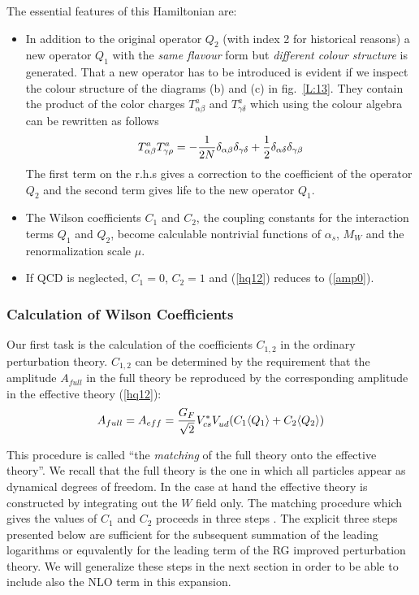 \documentclass[12pt]{article}
\def\as{\alpha_s}
\newcommand{\eqn}{\ref}
\begin{document}
\begin{itemize}
\begin{itemize}
\begin{itemize}
The essential features of this Hamiltonian are:
\begin{itemize}
\item In addition to the original operator $Q_2$ (with index 2 for 
historical reasons) 
 a new operator $Q_1$ with the {\it same flavour} form
but {\it different colour structure} is generated. 
That a new operator has to be introduced is evident if we
inspect the colour structure of the diagrams (b) and (c) in 
fig.~\ref{L:13}. They contain the
product of the color charges $T^a_{\alpha\beta}$ and 
$T^a_{\gamma\delta}$ which
using the colour algebra can be rewritten as follows
\begin{equation}\label{tata}
T^a_{\alpha\beta}T^a_{\gamma\rho}
=-{1\over 2N}\delta_{\alpha\beta}\delta_{\gamma\delta}+{1\over 2}
\delta_{\alpha\delta}\delta_{\gamma\beta}   \end{equation}
The first term on the r.h.s gives a correction to the coefficient
of the operator $Q_2$ and the second term gives life to the new
operator $Q_1$.
\item The Wilson coefficients $C_1$ and $C_2$, the coupling constants
for the interaction terms $Q_1$ and $Q_2$, become calculable nontrivial
functions of $\as$, $M_W$ and the renormalization scale $\mu$.
\item
If QCD is neglected, $C_1=0$, $C_2=1$ and
(\eqn{hq12}) reduces to (\eqn{amp0}).
\end{itemize}

\subsubsection{Calculation of Wilson Coefficients}
Our first task is the calculation of the coefficients $C_{1, 2}$
in the ordinary perturbation theory.
$C_{1, 2}$ can be  determined
by the requirement that the amplitude $A_{full}$ in the full theory be
reproduced by the corresponding amplitude in the effective theory
(\eqn{hq12}):
\begin{equation}\label{acq}
A_{full}=A_{eff}=
{G_F\over\sqrt{2}}V^*_{cs}V_{ud}^{}(C_1\langle Q_1\rangle +
C_2\langle Q_2\rangle)   \end{equation}

This procedure is called ``the {\it matching} of the 
full theory onto the
effective theory''. We recall that the full theory is the one in
which all particles appear as dynamical degrees of freedom.
In the case at hand the effective theory is constructed by
integrating out the $W$ field only. The matching procedure which
gives the values of $C_1$ and $C_2$ proceeds in three steps \cite{BBDM}.
The explicit three steps presented below are sufficient for
the subsequent summation of the leading logarithms or equvalently
for the leading term of the RG improved perturbation theory. 
We will generalize these steps in the next section in order to be able
to include also the NLO term in this expansion.


\end{itemize}
\end{itemize}
\end{itemize}
\end{document}
